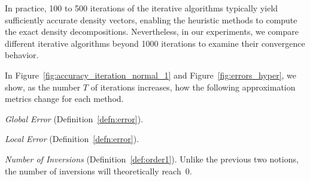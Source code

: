 In practice, 100 to 500 iterations of the iterative algorithms typically yield sufficiently accurate density vectors, enabling the heuristic methods to compute the exact density decompositions. Nevertheless, in our experiments, we compare different iterative algorithms beyond 1000 iterations to examine their convergence behavior.

In Figure~\ref{fig:accuracy_iteration_normal_1} and Figure~\ref{fig:errors_hyper}, we show, as the number $T$ of iterations increases, how the following approximation metrics
change for each method.

\begin{compactitem}

\item \emph{Global Error} (Definition~\ref{defn:error}).

\item  \emph{Local Error} (Definition~\ref{defn:error}). 

\item \emph{Number of Inversions} (Definition~\ref{def:order1}).
Unlike the previous two notions, 
the number of inversions
will theoretically reach~0.  

\end{compactitem}


